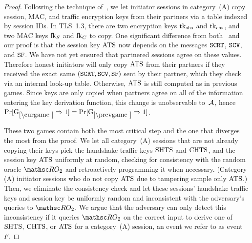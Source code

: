 \begin{proof}
	
	
	Following the technique of~\cite{C:CCGJJ19}, we let initiator sessions in category~(A) copy session, MAC, and traffic encryption keys from their partners via a table indexed by session IDs. 
	In TLS~1.3, there are two encryption keys $\mathrm{tk}_{\text{shs}}$ and $\mathrm{tk}_{\text{chs}}$, and two MAC keys $\mathrm{fk}_S$ and $\mathrm{fk}_C$ to copy. One significant difference from both~\cite{C:CCGJJ19} and our \SIGMAI proof is that the session key $\mathrm{ATS}$ now depends on the messages $\mathtt{SCRT}$, $\mathtt{SCV}$, and $\mathtt{SF}$. We have not yet ensured that partnered sessions agree on these values. Therefore honest initiators will only copy $\mathrm{ATS}$ from their partners if they received the exact same $(\mathtt{SCRT},\allowbreak \mathtt{SCV},\allowbreak \mathtt{SF})$ sent by their partner, which they check via an internal look-up table. Otherwise, $\mathrm{ATS}$ is still computed as in previous games. 
	Since keys are only copied when partners agree on all of the information entering the key derivation function, this change is unobservable to~$\mathcal{A}$, hence
	$\Pr[\curGm*\Rightarrow 1] = \Pr[\prevGm*\Rightarrow 1]$.
	
	
	
	These two games contain both the most critical step and the one that diverges the most from the \SIGMAI proof.
	We let all category~(A) sessions that are not already copying their keys pick the handshake traffic keys $\mathrm{SHTS}$ and $\mathrm{CHTS}$, and the session key $\mathrm{ATS}$ uniformly at random, checking for consistency with the random oracle $\RO_2$ and retroactively programming it when necessary.
	(Category (A) initiator sessions who do not copy $\mathrm{ATS}$ due to tampering sample only $\mathrm{ATS}$.) 
	Then, we eliminate the consistency check and let these sessions' handshake traffic keys and session key be uniformly random and inconsistent with the adversary's queries to $\RO_2$. 
	We argue that the adversary can only detect this inconsistency if it queries $\RO_2$ on the correct input to derive one of $\mathrm{SHTS}$, $\mathrm{CHTS}$, or $\mathrm{ATS}$ for a category~(A) session, an event we refer to as event~$F$. 
	

\end{proof}
